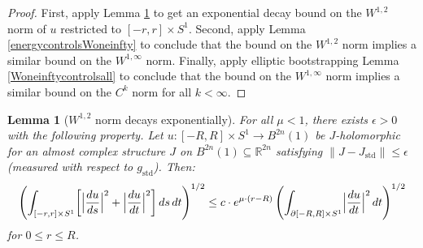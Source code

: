 \documentclass[12pt]{article}
\newtheorem{lemma}[theorem]{Lemma}
\theoremstyle{definition}
\theoremstyle{remark}
\numberwithin{equation}{subsection}
\newcommand{\RR}{\mathbb R}
\newcommand{\std}{\mathrm{std}}
\begin{document}
\begin{proof}
First, apply Lemma \ref{energydecayexponential} to get an exponential decay bound on the $W^{1,2}$ norm of $u$ restricted to $[-r,r]\times S^1$.  Second, apply Lemma \ref{energycontrolsWoneinfty} to conclude that the bound on the $W^{1,2}$ norm implies a similar bound on the $W^{1,\infty}$ norm.  Finally, apply elliptic bootstrapping Lemma \ref{Woneinftycontrolsall} to conclude that the bound on the $W^{1,\infty}$ norm implies a similar bound on the $C^k$ norm for all $k<\infty$.
\end{proof}

\begin{lemma}[$W^{1,2}$ norm decays exponentially]\label{energydecayexponential}
For all $\mu<1$, there exists $\epsilon>0$ with the following property.  Let $u:[-R,R]\times S^1\to B^{2n}(1)$ be $J$-holomorphic for an almost complex structure $J$ on $B^{2n}(1)\subseteq\RR^{2n}$ satisfying $\left\|J-J_\std\right\|\leq\epsilon$ (measured with respect to $g_\std$).  Then:
\begin{equation*}
\left(\int_{[-r,r]\times S^1}\biggl[\Bigl|\frac{du}{ds}\Bigr|^2+\Bigl|\frac{du}{dt}\Bigr|^2\biggr]\,ds\,dt\right)^{1/2}\leq c\cdot e^{\mu\cdot(r-R)}\left(\int_{\partial[-R,R]\times S^1}\Bigl|\frac{du}{dt}\Bigr|^2\,dt\right)^{1/2}
\end{equation*}
for $0\leq r\leq R$.
\end{lemma}
\end{document}
